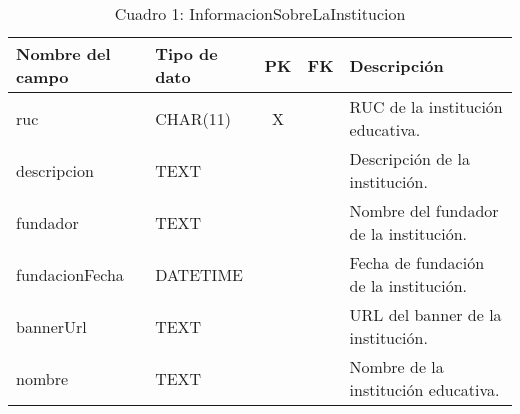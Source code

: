 \begin{table}[H]
	\centering
	\begin{tabular}{|l|l|c|c|l|}
		\hline
		\textbf{Nombre del campo} & \textbf{Tipo de dato} & \textbf{PK} & \textbf{FK} & \textbf{Descripción}                   \\
		\hline
		ruc                       & CHAR(11)              & X           &             & RUC de la institución educativa.       \\
		\hline
		descripcion               & TEXT                  &             &             & Descripción de la institución.         \\
		\hline
		fundador                  & TEXT                  &             &             & Nombre del fundador de la institución. \\
		\hline
		fundacionFecha            & DATETIME              &             &             & Fecha de fundación de la institución.  \\
		\hline
		bannerUrl                 & TEXT                  &             &             & URL del banner de la institución.      \\
		\hline
		nombre                    & TEXT                  &             &             & Nombre de la institución educativa.    \\
		\hline
	\end{tabular}
	\caption{Cuadro 1: InformacionSobreLaInstitucion}
\end{table}